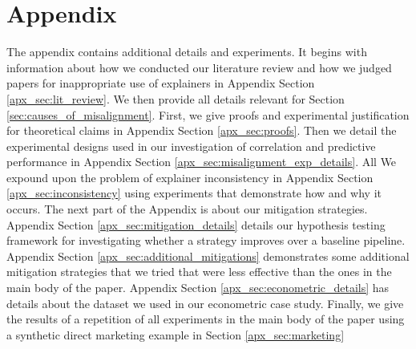 \documentclass[mnsc,blindrev]{informs3}
\begin{document}








\newpage

\section{Appendix}
    The appendix contains additional details and experiments. It begins with information about how we conducted our literature review and how we judged papers for inappropriate use of explainers in Appendix Section \ref{apx_sec:lit_review}. We then provide all details relevant for Section \ref{sec:causes_of_misalignment}. First, we give proofs and experimental justification for theoretical claims in Appendix Section \ref{apx_sec:proofs}.
    Then we detail the experimental designs used in our investigation of correlation and predictive performance in Appendix Section \ref{apx_sec:misalignment_exp_details}. All  We expound upon the problem of explainer inconsistency in Appendix Section \ref{apx_sec:inconsistency} using experiments that demonstrate how and why it occurs. The next part of the Appendix is about our mitigation strategies. Appendix Section \ref{apx_sec:mitigation_details} details our hypothesis testing framework for investigating whether a strategy improves over a baseline pipeline. Appendix Section \ref{apx_sec:additional_mitigations} demonstrates some additional mitigation strategies that we tried that were less effective than the ones in the main body of the paper. Appendix Section \ref{apx_sec:econometric_details} has details about the dataset we used in our econometric case study. Finally, we give the results of a repetition of all experiments in the main body of the paper using a synthetic direct marketing example in Section \ref{apx_sec:marketing}
    
\end{document}
